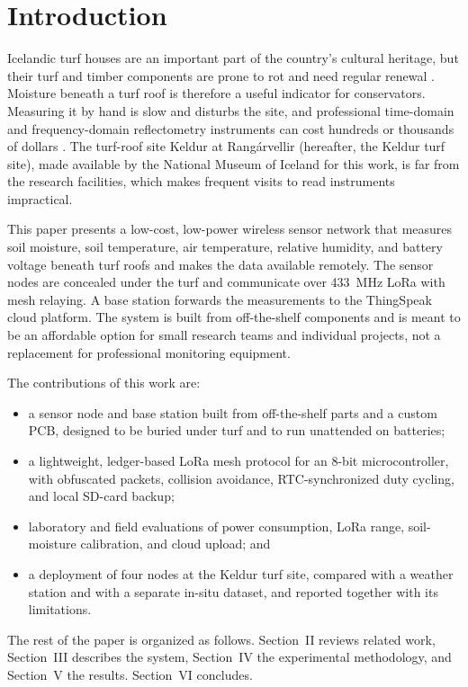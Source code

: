\section{Introduction}
Icelandic turf houses are an important part of the country's cultural heritage, but their turf and timber components are prone to rot and need regular renewal \cite{ref10,ref06}. Moisture beneath a turf roof is therefore a useful indicator for conservators. Measuring it by hand is slow and disturbs the site, and professional time-domain and frequency-domain reflectometry instruments can cost hundreds or thousands of dollars \cite{ref19}. The turf-roof site Keldur at Rangárvellir (hereafter, the Keldur turf site), made available by the National Museum of Iceland for this work, is far from the research facilities, which makes frequent visits to read instruments impractical.

This paper presents a low-cost, low-power wireless sensor network that measures soil moisture, soil temperature, air temperature, relative humidity, and battery voltage beneath turf roofs and makes the data available remotely. The sensor nodes are concealed under the turf and communicate over 433~MHz LoRa with mesh relaying. A base station forwards the measurements to the ThingSpeak cloud platform. The system is built from off-the-shelf components and is meant to be an affordable option for small research teams and individual projects, not a replacement for professional monitoring equipment.

The contributions of this work are:
\begin{itemize}
\item a sensor node and base station built from off-the-shelf parts and a custom PCB, designed to be buried under turf and to run unattended on batteries;
\item a lightweight, ledger-based LoRa mesh protocol for an 8-bit microcontroller, with obfuscated packets, collision avoidance, RTC-synchronized duty cycling, and local SD-card backup;
\item laboratory and field evaluations of power consumption, LoRa range, soil-moisture calibration, and cloud upload; and
\item a deployment of four nodes at the Keldur turf site, compared with a weather station and with a separate in-situ dataset, and reported together with its limitations.
\end{itemize}

The rest of the paper is organized as follows. Section~II reviews related work, Section~III describes the system, Section~IV the experimental methodology, and Section~V the results. Section~VI concludes.
